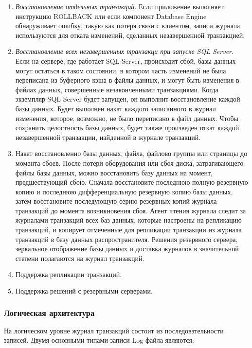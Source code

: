 \begin{enumerate}
	\item \textit{Восстановление отдельных транзакций}. Если приложение выполняет инструкцию ROLLBACK или если 
	компонент Database Engine обнаруживает ошибку, такую как потеря связи с клиентом, записи журнала используются 
	для отката изменений, сделанных незавершенной транзакцией.
	\item \textit{Восстановление всех незавершенных транзакци при запуске SQL Server}. Если на сервере, где работает SQL
	Server, происходит сбой, базы данных могут остаться в таком состоянии, в котором часть изменений не была 
	переписана из буферного кэша в файлы данных, и могут быть изменения в файлах данных, совершенные 
	незаконченными транзакциями. Когда экземпляр SQL Server будет запущен, он выполнит восстановление каждой 
	базы данных. Будет выполнен накат каждого записанного в журнал изменения, которое, возможно, не было 
	переписано в файл данных. Чтобы сохранить целостность базы данных, будет также произведен откат каждой 
	незавершенной транзакции, найденной в журнале транзакций.
	\item Накат восстановленно базы данных, файла, файлово группы или страницы до момента сбоев. После потери 
	оборудования или сбоя диска, затрагивающего файлы базы данных, можно восстановить базу данных на момент, 
	предшествующий сбою. Сначала восстановите последнюю полную резервную копию и последнюю 
	дифференциальную резервную копию базы данных, затем восстановите последующую серию резервных копий 
	журнала транзакций до момента возникновения сбоя. Агент чтения журнала следит за журналами транзакций всех баз данных, 
	которые настроены на репликацию транзакций, и копирует отмеченные для репликации транзакции из журнала 
	транзакций в базу данных распространителя. Решения резервного сервера, зеркальное отображение базы данных 
	и доставка журналов в значительной степени полагаются на журнал транзакций. 
	\item Поддержка репликации транзакций.
	\item Поддержка решений с резервными серверами.
\end{enumerate}

\subsubsection{Логическая архитектура}

На логическом уровне журнал транзакций состоит из последовательности записей. Двумя основными типами записи Log-файла являются:

